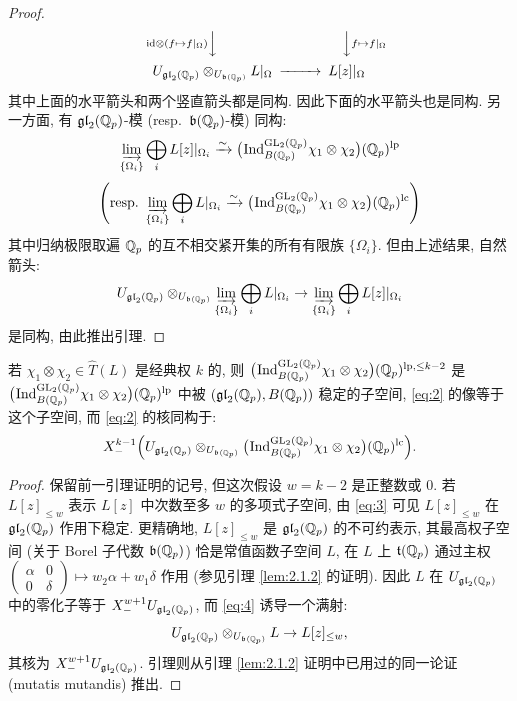 \begin{proof}
\[\begin{CD}
@V{\mathrm{id} \otimes (f \mapsto f|_{\Omega})}VV @VV{f \mapsto f|_{\Omega}}V\\
U_{\mathfrak{gl}_2(\Qp)} \otimes_{U_{\mathfrak{b}(\Qp)}} L|_{\Omega} @>>> L[z]|_{\Omega}
\end{CD}
\]
其中上面的水平箭头和两个竖直箭头都是同构.
因此下面的水平箭头也是同构.
另一方面, 有 $\mathfrak{gl}_2(\mathbb{Q}_p)$-模 (resp.\ $\mathfrak{b}(\mathbb{Q}_p)$-模) 同构:
\[
\varinjlim_{\{\Omega_i\}} \bigoplus_i L[z]|_{\Omega_i} \xrightarrow{\sim} \bigl(\prescript{}{}{\mathrm{Ind}}_{B(\mathbb{Q}_p)}^{\mathrm{GL}_2(\mathbb{Q}_p)} \chi_1 \otimes \chi_2\bigr)(\mathbb{Q}_p)^{\mathrm{lp}}
\]
\[
\left(\text{resp.}\ \varinjlim_{\{\Omega_i\}} \bigoplus_i L|_{\Omega_i} \xrightarrow{\sim} \bigl(\prescript{}{}{\mathrm{Ind}}_{B(\mathbb{Q}_p)}^{\mathrm{GL}_2(\mathbb{Q}_p)} \chi_1 \otimes \chi_2\bigr)(\mathbb{Q}_p)^{\mathrm{lc}}\right)
\]
其中归纳极限取遍 $\mathbb{Q}_p$ 的互不相交紧开集的所有有限族 $\{\Omega_i\}$.
但由上述结果, 自然箭头:
\[
U_{\mathfrak{gl}_2(\mathbb{Q}_p)} \otimes_{U_{\mathfrak{b}(\mathbb{Q}_p)}} \varinjlim_{\{\Omega_i\}} \bigoplus_i L|_{\Omega_i} \to \varinjlim_{\{\Omega_i\}} \bigoplus_i L[z]|_{\Omega_i}
\]
是同构, 由此推出引理.
\end{proof}

\begin{lemma}\label{lem:2.1.3}
若 $\chi_1 \otimes \chi_2 \in \widehat{T}(L)$ 是经典权 $k$ 的, 则 $\bigl(\prescript{}{}{\mathrm{Ind}}_{B(\mathbb{Q}_p)}^{\mathrm{GL}_2(\mathbb{Q}_p)} \chi_1 \otimes \chi_2\bigr)(\mathbb{Q}_p)^{\mathrm{lp},\le k-2}$ 是 $\bigl(\prescript{}{}{\mathrm{Ind}}_{B(\mathbb{Q}_p)}^{\mathrm{GL}_2(\mathbb{Q}_p)} \chi_1 \otimes \chi_2\bigr)(\mathbb{Q}_p)^{\mathrm{lp}}$ 中被 $(\mathfrak{gl}_2(\mathbb{Q}_p),B(\mathbb{Q}_p))$ 稳定的子空间, \eqref{eq:2} 的像等于这个子空间, 而 \eqref{eq:2} 的核同构于:
\[
X_{-}^{k-1} \Bigl(U_{\mathfrak{gl}_2(\mathbb{Q}_p)} \otimes_{U_{\mathfrak{b}(\mathbb{Q}_p)}} \bigl(\prescript{}{}{\mathrm{Ind}}_{B(\mathbb{Q}_p)}^{\mathrm{GL}_2(\mathbb{Q}_p)} \chi_1 \otimes \chi_2\bigr)(\mathbb{Q}_p)^{\mathrm{lc}}\Bigr).
\]
\end{lemma}

\begin{proof}
保留前一引理证明的记号, 但这次假设 $w = k-2$ 是正整数或 $0$.
若 $L[z]_{\le w}$ 表示 $L[z]$ 中次数至多 $w$ 的多项式子空间, 由 \eqref{eq:3} 可见 $L[z]_{\le w}$ 在 $\mathfrak{gl}_2(\mathbb{Q}_p)$ 作用下稳定.
更精确地, $L[z]_{\le w}$ 是 $\mathfrak{gl}_2(\mathbb{Q}_p)$ 的不可约表示, 其最高权子空间 (关于 Borel 子代数 $\mathfrak{b}(\mathbb{Q}_p)$) 恰是常值函数子空间 $L$, 在 $L$ 上 $\mathfrak{t}(\mathbb{Q}_p)$ 通过主权 $\begin{pmatrix} \alpha & 0 \\ 0 & \delta \end{pmatrix} \mapsto w_2\alpha + w_1\delta$ 作用 (参见引理 \ref{lem:2.1.2} 的证明).
因此 $L$ 在 $U_{\mathfrak{gl}_2(\mathbb{Q}_p)}$ 中的零化子等于 $X_{-}^{w+1}U_{\mathfrak{gl}_2(\mathbb{Q}_p)}$, 而 \eqref{eq:4} 诱导一个满射:
\[
U_{\mathfrak{gl}_2(\mathbb{Q}_p)} \otimes_{U_{\mathfrak{b}(\mathbb{Q}_p)}} L \to L[z]_{\le w},
\]
其核为 $X_{-}^{w+1}U_{\mathfrak{gl}_2(\mathbb{Q}_p)}$.
引理则从引理 \ref{lem:2.1.2} 证明中已用过的同一论证 (mutatis mutandis) 推出.
\end{proof}

